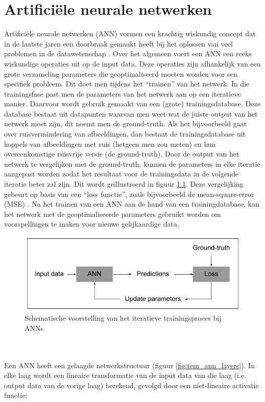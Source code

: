 \documentclass{report}
\begin{document}
\chapter{Artificiële neurale netwerken} \label{ch:nn}
Artificiële neurale netwerken (ANN) vormen een krachtig wiskundig concept dat in de laatste jaren een doorbraak gemaakt heeft bij het oplossen van veel problemen in de datawetenschap \cite{review:nn_usecase}. Over het algemeen voert een ANN een reeks wiskundige operaties uit op de input data. Deze operaties zijn afhankelijk van een grote verzameling parameters die geoptimaliseerd moeten worden voor een specifiek probleem. Dit doet men tijdens het ``trainen'' van het netwerk. In die trainingsfase past men de parameters van het netwerk aan op een iteratieve manier. Daarvoor wordt gebruik gemaakt van een (grote) trainingsdatabase. Deze database bestaat uit datapunten waarvan men weet wat de juiste output van het netwerk moet zijn, dit noemt men de ground-truth. Als het bijvoorbeeld gaat over ruisvermindering van afbeeldingen, dan bestaat de trainingsdatabase uit koppels van afbeeldingen met ruis (hetgeen men zou meten) en hun overeenkomstige ruisvrije versie (de ground-truth). Door de output van het netwerk te vergelijken met de ground-truth, kunnen de parameters in elke iteratie aangepast worden zodat het resultaat voor de trainingsdata in de volgende iteratie beter zal zijn. Dit wordt geïllustreerd in figuur \ref{fig:tem_ann_training}. Deze vergelijking gebeurt op basis van een ``loss functie'', zoals bijvoorbeeld de mean-square-error (MSE) \cite{book:ann}. Na het trainen van een ANN aan de hand van een trainingdatabase, kan het netwerk met de geoptimaliseerde parameters gebruikt worden om voorspellingen te maken voor nieuwe gelijkaardige data. 
\begin{figure}[h!]
	\centering
	\includegraphics[width=12cm]{images/tem/ann_training.png}
	\caption{Schematische voorstelling van het iteratieve trainingsproces bij ANNs}
	\label{fig:tem_ann_training}
\end{figure}
\\ \\
Een ANN heeft een gelaagde netwerkstructuur (figuur \ref{fig:tem_ann_layers}). In elke laag wordt een lineaire transformatie van de input data van die laag (i.e. output data van de vorige laag) berekend, gevolgd door een niet-lineaire activatie functie:
\end{document}
